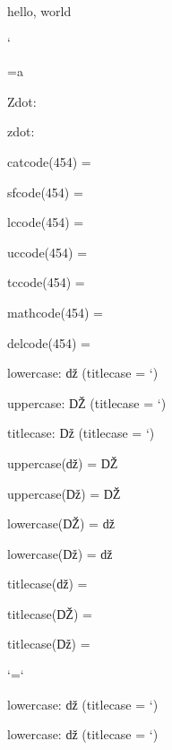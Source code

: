 \documentclass{article}
\begin{document}
hello, world


\lccode` %



\lowercase{={a}}

\showthe{}

Zdot: \uppercase\expandafter{\the{}}

zdot: \the{}

catcode(454) = \the{}

sfcode(454) = \the{}

lccode(454) = \the{}

uccode(454) = \the{}

tccode(454) = \the{}

mathcode(454) = \the{}

delcode(454) = \the{}

\uppercase{}

lowercase: ǆ (titlecase = \char\tccode`\ǆ)

uppercase: Ǆ (titlecase = \char\tccode`\Ǆ)

titlecase: ǅ (titlecase = \char\tccode`\ǅ)

uppercase(ǆ) = \uppercase{ǆ}

uppercase(ǅ) = \uppercase{ǅ}

lowercase(Ǆ) = \lowercase{Ǆ}

lowercase(ǅ) = \lowercase{ǅ}

titlecase(ǆ) = 

titlecase(Ǆ) = 

titlecase(ǅ) = 

\begingroup
\tccode`\ǆ=`\D

lowercase: ǆ (titlecase = \char\tccode`\ǆ)

\endgroup

lowercase: ǆ (titlecase = \char\tccode`\ǆ)
\end{document}
